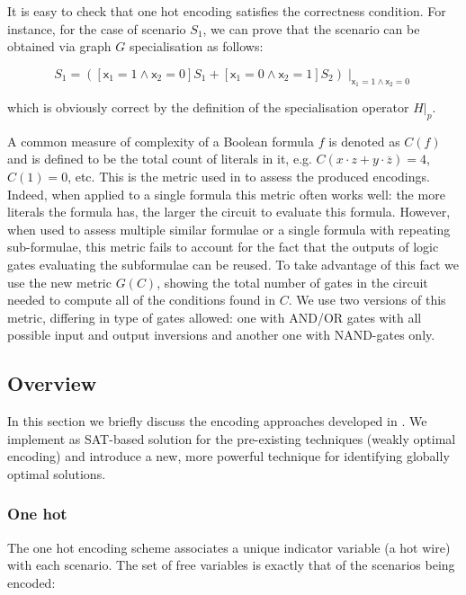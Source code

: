 \noindent
It is easy to check that one hot encoding satisfies the correctness condition. For instance, for the case of scenario $S_1$, we can prove that the scenario can be obtained via graph $G$ specialisation as follows:


$$
S_1 = ([\mathsf{x}_1 = 1 \wedge \mathsf{x}_2 = 0]S_1 + [\mathsf{x}_1 = 0 \wedge \mathsf{x}_2 = 1]S_2) \mid_{\mathsf{x}_1 = 1 \wedge \mathsf{x}_2 = 0}
$$

\noindent
which is obviously correct by the definition of the specialisation operator $H|_p$.


A common measure of complexity of a Boolean formula $f$ is denoted
as $C(f)$ and is defined to be the total count of literals in it,
e.g. $C(x\cdot z+y\cdot\overline{z})=4$, $C(1)=0$, etc. 
This is the metric used in \cite{2009_mokhov_phd} to assess the produced encodings.
Indeed, when applied to a single formula this metric often works well:
the more literals the formula has, the larger the circuit to evaluate this formula.
However, when used to assess multiple similar formulae or a single formula with repeating sub-formulae,
this metric fails to account for the fact that the outputs of logic gates evaluating the subformulae
can be reused. To take advantage of this fact we use the new metric $G(C)$, showing the total number of
 gates in the circuit needed to compute all of the conditions found in $C$.
We use two versions of this metric, differing in type of gates allowed: one with AND/OR gates with 
all possible input and output inversions and another one with NAND-gates only.

\subsection{Overview}

In this section we briefly discuss the encoding approaches developed in \cite{2009_mokhov_phd}. We implement as SAT-based solution for the pre-existing techniques (weakly optimal encoding) and introduce a new, more powerful technique for identifying globally optimal solutions. 

\subsubsection{One hot}

The one hot encoding scheme associates a unique indicator variable (a hot wire) with each scenario. The set of free variables is exactly that of the scenarios being encoded:

